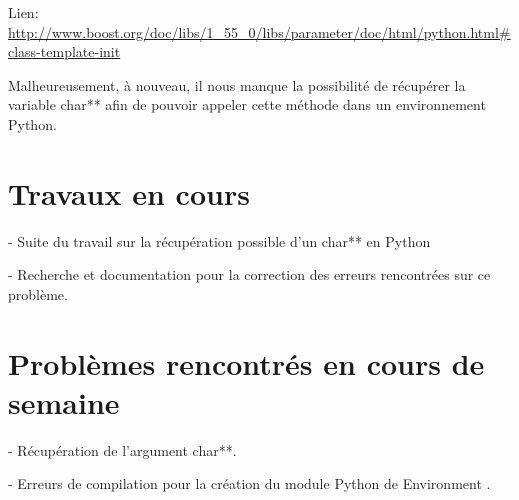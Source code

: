 \documentclass[12pt]{article}
\begin{document}
Lien:
\url{http://www.boost.org/doc/libs/1_55_0/libs/parameter/doc/html/python.html#class-template-init}

Malheureusement, à nouveau, il nous manque la possibilité  de récupérer la variable char** afin de pouvoir appeler cette méthode dans un environnement Python.

\section{Travaux en cours}
- Suite du travail sur la récupération possible d'un char** en Python

- Recherche et documentation pour la correction des erreurs rencontrées sur ce problème.

\section{Problèmes rencontrés en cours de semaine}
- Récupération de l'argument char**.

- Erreurs de compilation pour la création du module Python de Environment .
\end{document}
